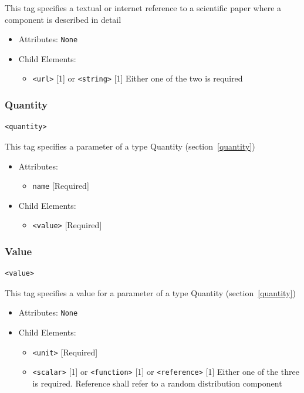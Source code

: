 \documentclass{article}
\begin{document}
This tag specifies a textual or internet reference to a scientific paper where
a component is described in detail

\begin{itemize}
\item Attributes: \texttt{None}

\item Child Elements:
%
\begin{itemize}
\item \verb|<url>| {[}1{]} or \verb|<string>| {[}1{]} Either one
of the two is required
\end{itemize}

\end{itemize}

\subsubsection{Quantity}
%
\begin{lstlisting}
<quantity>
\end{lstlisting}

This tag specifies a parameter of a type Quantity (section~\ref{quantity})

\begin{itemize}
\item Attributes:
%
\begin{itemize}
\item \verb|name| {[}Required{]}
\end{itemize}


\item Child Elements:
%
\begin{itemize}
\item \verb|<value>| {[}Required{]}
\end{itemize}

\end{itemize}

\subsubsection{Value}
%
\begin{lstlisting}
<value>
\end{lstlisting}

This tag specifies a value for a parameter of a type Quantity
(section~\ref{quantity})

\begin{itemize}
\item Attributes: \texttt{None}

\item Child Elements:
%
\begin{itemize}
\item \verb|<unit>| {[}Required{]}
\item \verb|<scalar>| {[}1{]} or \verb|<function>| {[}1{]} or
\verb|<reference>| {[}1{]} Either one of the three is required. Reference
shall refer to a random distribution component
\end{itemize}

\end{itemize}
\end{document}
